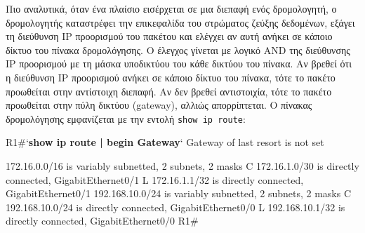 \documentclass{EdipyLabs} %
\begin{document}
Πιο αναλυτικά, όταν ένα πλαίσιο εισέρχεται σε μια διεπαφή ενός δρομολογητή, ο δρομολογητής καταστρέφει την επικεφαλίδα του στρώματος ζεύξης δεδομένων, εξάγει τη διεύθυνση IP προορισμού του πακέτου και ελέγχει αν αυτή ανήκει σε κάποιο δίκτυο του πίνακα δρομολόγησης. Ο έλεγχος γίνεται με λογικό AND της διεύθυνσης IP προορισμού με τη μάσκα υποδικτύου του κάθε δικτύου του πίνακα. Αν βρεθεί ότι η διεύθυνση IP προορισμού ανήκει σε κάποιο δίκτυο του πίνακα, τότε το πακέτο προωθείται στην αντίστοιχη διεπαφή. Αν δεν βρεθεί αντιστοιχία, τότε το πακέτο προωθείται στην πύλη δικτύου (gateway), αλλιώς απορρίπτεται. Ο πίνακας δρομολόγησης εμφανίζεται με την εντολή \texttt{show ip route}:

\begin{CommandBox}
R1#`\textbf{show ip route | begin Gateway}`
Gateway of last resort is not set

     172.16.0.0/16 is variably subnetted, 2 subnets, 2 masks
C       172.16.1.0/30 is directly connected, GigabitEthernet0/1
L       172.16.1.1/32 is directly connected, GigabitEthernet0/1
     192.168.10.0/24 is variably subnetted, 2 subnets, 2 masks
C       192.168.10.0/24 is directly connected, GigabitEthernet0/0
L       192.168.10.1/32 is directly connected, GigabitEthernet0/0
R1#
\end{CommandBox}
\end{document}
